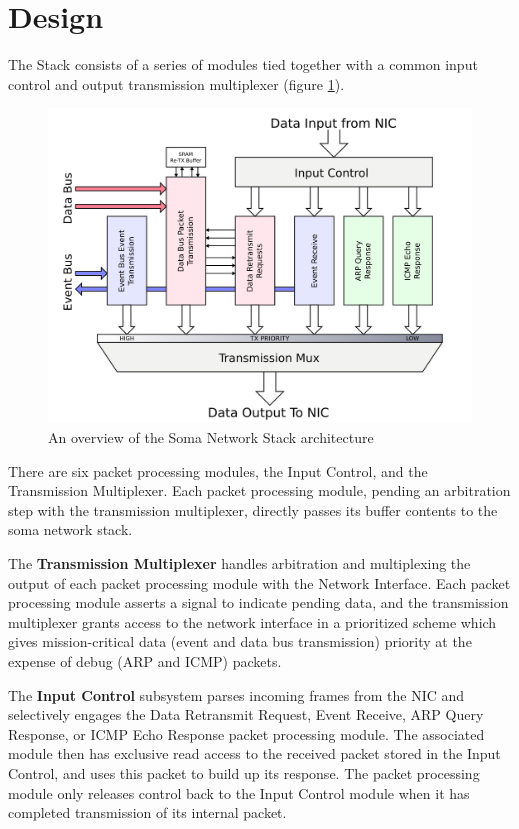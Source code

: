 \section{Design}

The Stack consists of a series of modules tied together with a common
input control and output transmission multiplexer (figure
\ref{overview.simple}).
 
\begin{figure}
\begin{centering}
\includegraphics[scale=0.8]{overview.simple.svg}
\end{centering}
\caption{An overview of the Soma Network Stack architecture}
\label{overview.simple}
\end{figure}

There are six packet processing modules, the Input Control, and the
Transmission Multiplexer. Each packet processing module, pending an
arbitration step with the transmission multiplexer, directly passes
its buffer contents to the soma network stack.

The \textbf{Transmission Multiplexer} handles arbitration and
multiplexing the output of each packet processing module with the
Network Interface. Each packet processing module asserts a signal to
indicate pending data, and the transmission multiplexer grants access
to the network interface in a prioritized scheme which gives
mission-critical data (event and data bus transmission) priority at
the expense of debug (ARP and ICMP) packets.

The \textbf{Input Control} subsystem parses incoming frames from the
NIC and selectively engages the Data Retransmit Request, Event
Receive, ARP Query Response, or ICMP Echo Response packet processing
module. The associated module then has exclusive read access to the
received packet stored in the Input Control, and uses this packet to
build up its response. The packet processing module only releases
control back to the Input Control module when it has completed
transmission of its internal packet.

